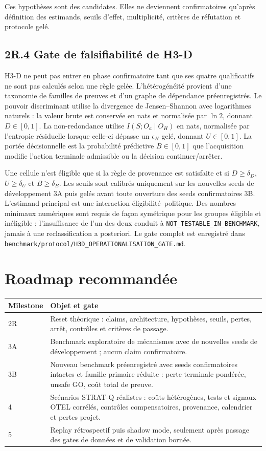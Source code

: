 \documentclass[11pt,a4paper]{article}
\begin{document}
Ces hypothèses sont des candidates. Elles ne deviennent confirmatoires qu'après définition des estimands, seuils d'effet, multiplicité, critères de réfutation et protocole gelé.

\subsection{2R.4 Gate de falsifiabilité de H3-D}

H3-D ne peut pas entrer en phase confirmatoire tant que ses quatre qualificatifs ne sont pas calculés selon une règle gelée. L'hétérogénéité provient d'une taxonomie de familles de preuves et d'un graphe de dépendance préenregistrés. Le pouvoir discriminant utilise la divergence de Jensen--Shannon avec logarithmes naturels : la valeur brute est conservée en nats et normalisée par $\ln 2$, donnant $D\in[0,1]$. La non-redondance utilise $I(S;O_a\mid O_H)$ en nats, normalisée par l'entropie résiduelle lorsque celle-ci dépasse un $\epsilon_H$ gelé, donnant $U\in[0,1]$. La portée décisionnelle est la probabilité prédictive $B\in[0,1]$ que l'acquisition modifie l'action terminale admissible ou la décision continuer/arrêter.

Une cellule n'est éligible que si la règle de provenance est satisfaite et si $D\geq\delta_D$, $U\geq\delta_U$ et $B\geq\delta_B$. Les seuils sont calibrés uniquement sur les nouvelles seeds de développement 3A puis gelés avant toute ouverture des seeds confirmatoires 3B. L'estimand principal est une interaction éligibilité--politique. Des nombres minimaux numériques sont requis de façon symétrique pour les groupes éligible et inéligible ; l'insuffisance de l'un des deux conduit à \texttt{NOT\_TESTABLE\_IN\_BENCHMARK}, jamais à une reclassification a posteriori. Le gate complet est enregistré dans \texttt{benchmark/protocol/H3D\_OPERATIONALISATION\_GATE.md}.

\section{Roadmap recommandée}

\begin{longtable}{p{}p{}}
\toprule
Milestone & Objet et gate \\
\midrule
2R & Reset théorique : claims, architecture, hypothèses, seuils, pertes, arrêt, contrôles et critères de passage. \\
3A & Benchmark exploratoire de mécanismes avec de nouvelles seeds de développement ; aucun claim confirmatoire. \\
3B & Nouveau benchmark préenregistré avec seeds confirmatoires intactes et famille primaire réduite : perte terminale pondérée, unsafe GO, coût total de preuve. \\
4 & Scénarios STRAT-Q réalistes : coûts hétérogènes, tests et signaux OTEL corrélés, contrôles compensatoires, provenance, calendrier et pertes projet. \\
5 & Replay rétrospectif puis shadow mode, seulement après passage des gates de données et de validation bornée. \\
\bottomrule
\end{longtable}
\end{document}
